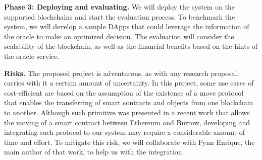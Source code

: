 \textbf{Phase 3: Deploying and evaluating.} We will deploy the system on the supported
blockchains and start the evaluation process. To benchmark the system, we will develop a
sample DApps that could leverage the information of the oracle to make an optimized
decision. The evaluation will consider the scalability of the blockchain, as
well as the financial benefits based on the hints of the oracle service.

\textbf{Risks.} The proposed project is adventurous, as with any research
proposal, carries with it a certain amount of uncertainty. In this project, some
use cases of cost-efficient are based on the assumption of the existence of a move
protocol that enables the transferring of smart contracts and objects from one
blockchain to another. Although such primitive was presented in a recent work
\cite{fynn2020move} that allows the moving of a smart contract between Ethereum
and Burrow, developing and integrating such protocol to our system
may require a considerable amount of time and effort. To mitigate this risk, we will
collaborate with Fynn Enrique, the main author of that work, to help us with the
integration.






